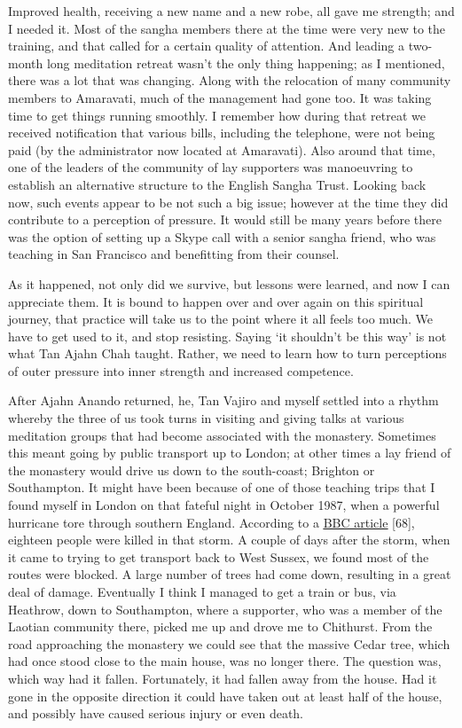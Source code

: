 Improved health, receiving a new name and a new robe, all gave me
strength; and I needed it. Most of the sangha members there at the time
were very new to the training, and that called for a certain quality of
attention. And leading a two-month long meditation retreat wasn't the
only thing happening; as I mentioned, there was a lot that was changing.
Along with the relocation of many community members to Amaravati, much
of the management had gone too. It was taking time to get things running
smoothly. I remember how during that retreat we received notification
that various bills, including the telephone, were not being paid (by the
administrator now located at Amaravati). Also around that time, one of
the leaders of the community of lay supporters was manoeuvring to
establish an alternative structure to the English Sangha Trust. Looking
back now, such events appear to be not such a big issue; however at the
time they did contribute to a perception of pressure. It would still be
many years before there was the option of setting up a Skype call with a
senior sangha friend, who was teaching in San Francisco and benefitting
from their counsel.

As it happened, not only did we survive, but lessons were learned, and
now I can appreciate them. It is bound to happen over and over again on
this spiritual journey, that practice will take us to the point where it
all feels too much. We have to get used to it, and stop resisting.
Saying `it shouldn't be this way' is not what Tan Ajahn Chah taught.
Rather, we need to learn how to turn perceptions of outer pressure into
inner strength and increased competence.

After Ajahn Anando returned, he, Tan Vajiro and myself settled into a
rhythm whereby the three of us took turns in visiting and giving talks
at various meditation groups that had become associated with the
monastery. Sometimes this meant going by public transport up to London;
at other times a lay friend of the monastery would drive us down to the
south-coast; Brighton or Southampton. It might have been because of one
of those teaching trips that I found myself in London on that fateful
night in October 1987, when a powerful hurricane tore through southern
England. According to a
\href{https://www.bbc.co.uk/news/uk-england-kent-41366241}{\underline{BBC
article}} {[}68{]}, eighteen people were killed in that storm. A couple
of days after the storm, when it came to trying to get transport back to
West Sussex, we found most of the routes were blocked. A large number of
trees had come down, resulting in a great deal of damage. Eventually I
think I managed to get a train or bus, via Heathrow, down to
Southampton, where a supporter, who was a member of the Laotian
community there, picked me up and drove me to Chithurst. From the road
approaching the monastery we could see that the massive Cedar tree,
which had once stood close to the main house, was no longer there. The
question was, which way had it fallen. Fortunately, it had fallen away
from the house. Had it gone in the opposite direction it could have
taken out at least half of the house, and possibly have caused serious
injury or even death.

